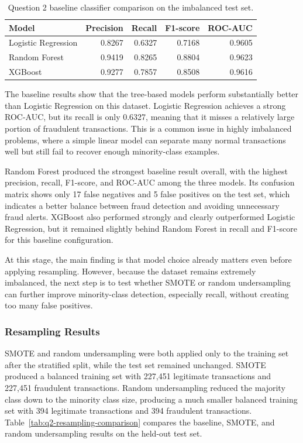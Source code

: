 \documentclass[11pt]{article}
\begin{document}
\begin{table}[ht]
    \centering
    \caption{Question 2 baseline classifier comparison on the imbalanced test set.}
    \label{tab:q2-baseline-models}
    \begin{tabular}{lrrrr}
        \toprule
        Model & Precision & Recall & F1-score & ROC-AUC \\
        \midrule
        Logistic Regression & 0.8267 & 0.6327 & 0.7168 & 0.9605 \\
        Random Forest & 0.9419 & 0.8265 & 0.8804 & 0.9623 \\
        XGBoost & 0.9277 & 0.7857 & 0.8508 & 0.9616 \\
        \bottomrule
    \end{tabular}
\end{table}

The baseline results show that the tree-based models perform substantially better than Logistic Regression on this dataset. Logistic Regression achieves a strong ROC-AUC, but its recall is only 0.6327, meaning that it misses a relatively large portion of fraudulent transactions. This is a common issue in highly imbalanced problems, where a simple linear model can separate many normal transactions well but still fail to recover enough minority-class examples.

Random Forest produced the strongest baseline result overall, with the highest precision, recall, F1-score, and ROC-AUC among the three models. Its confusion matrix shows only 17 false negatives and 5 false positives on the test set, which indicates a better balance between fraud detection and avoiding unnecessary fraud alerts. XGBoost also performed strongly and clearly outperformed Logistic Regression, but it remained slightly behind Random Forest in recall and F1-score for this baseline configuration.

At this stage, the main finding is that model choice already matters even before applying resampling. However, because the dataset remains extremely imbalanced, the next step is to test whether SMOTE or random undersampling can further improve minority-class detection, especially recall, without creating too many false positives.

\subsubsection{Resampling Results}

SMOTE and random undersampling were both applied only to the training set after the stratified split, while the test set remained unchanged. SMOTE produced a balanced training set with 227,451 legitimate transactions and 227,451 fraudulent transactions. Random undersampling reduced the majority class down to the minority class size, producing a much smaller balanced training set with 394 legitimate transactions and 394 fraudulent transactions. Table~\ref{tab:q2-resampling-comparison} compares the baseline, SMOTE, and random undersampling results on the held-out test set.
\end{document}

